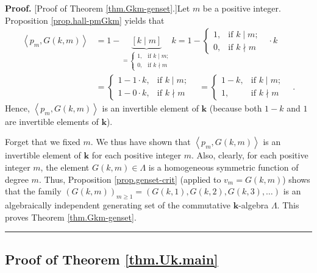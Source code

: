 \documentclass[numbers=enddot,12pt,final,onecolumn,notitlepage]{scrartcl}%
\theoremstyle{definition}
\newenvironment{proof}[1][Proof]{\noindent\textbf{#1.} }{\ \rule{0.5em}{0.5em}}
\begin{document}
\begin{proof}
[Proof of Theorem \ref{thm.Gkm-genset}.]Let $m$ be a positive integer.
Proposition \ref{prop.hall-pmGkm} yields that%
\begin{align*}
\left\langle p_{m},G\left(  k,m\right)  \right\rangle  &
=1-\underbrace{\left[  k\mid m\right]  }_{=%
\begin{cases}
1, & \text{if }k\mid m;\\
0, & \text{if }k\nmid m
\end{cases}
}k=1-%
\begin{cases}
1, & \text{if }k\mid m;\\
0, & \text{if }k\nmid m
\end{cases}
\ \ \ \cdot k\\
&  =%
\begin{cases}
1-1\cdot k, & \text{if }k\mid m;\\
1-0\cdot k, & \text{if }k\nmid m
\end{cases}
\ \ \ \ =%
\begin{cases}
1-k, & \text{if }k\mid m;\\
1, & \text{if }k\nmid m
\end{cases}
\ \ \ \ .
\end{align*}
Hence, $\left\langle p_{m},G\left(  k,m\right)  \right\rangle $ is an
invertible element of $\mathbf{k}$ (because both $1-k$ and $1$ are invertible
elements of $\mathbf{k}$).

Forget that we fixed $m$. We thus have shown that $\left\langle p_{m},G\left(
k,m\right)  \right\rangle $ is an invertible element of $\mathbf{k}$ for each
positive integer $m$. Also, clearly, for each positive integer $m$, the
element $G\left(  k,m\right)  \in\Lambda$ is a homogeneous symmetric function
of degree $m$. Thus, Proposition \ref{prop.genset-crit} (applied to
$v_{m}=G\left(  k,m\right)  $) shows that the family $\left(  G\left(
k,m\right)  \right)  _{m\geq1}=\left(  G\left(  k,1\right)  ,G\left(
k,2\right)  ,G\left(  k,3\right)  ,\ldots\right)  $ is an algebraically
independent generating set of the commutative $\mathbf{k}$-algebra $\Lambda$.
This proves Theorem \ref{thm.Gkm-genset}.
\end{proof}

\subsection{\label{subsect.proofs.Uk.main}Proof of Theorem \ref{thm.Uk.main}}
\end{document}
